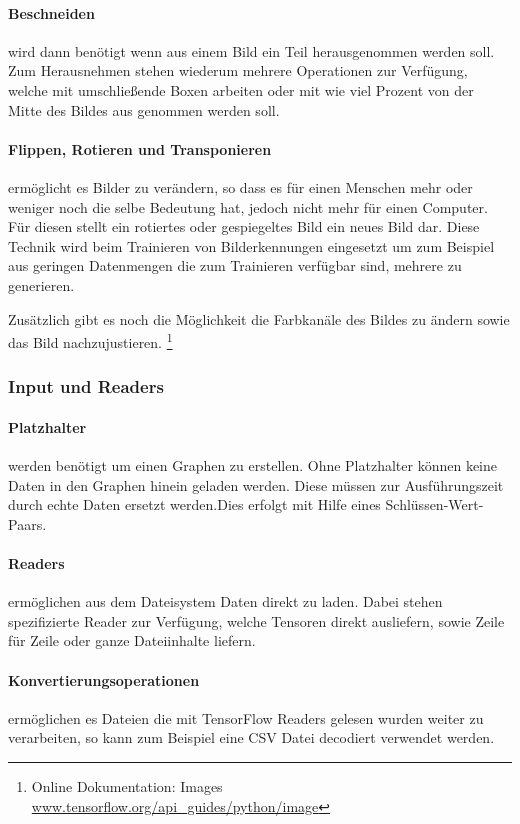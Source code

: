 \paragraph{Beschneiden} wird dann benötigt wenn aus einem Bild ein Teil herausgenommen werden soll. 
Zum Herausnehmen stehen wiederum mehrere Operationen zur Verfügung, welche mit umschließende Boxen arbeiten oder mit wie viel Prozent von der Mitte des Bildes aus genommen werden soll.

\paragraph{Flippen, Rotieren und Transponieren} ermöglicht es Bilder zu verändern, so dass es für einen Menschen mehr oder weniger noch die selbe Bedeutung hat, jedoch nicht mehr für einen Computer. 
Für diesen stellt ein rotiertes oder gespiegeltes Bild ein neues Bild dar. 
Diese Technik wird beim Trainieren von Bilderkennungen eingesetzt um zum Beispiel aus geringen Datenmengen die zum Trainieren verfügbar sind, mehrere zu generieren.
\phantom \newline

\noindent
Zusätzlich gibt es noch die Möglichkeit die Farbkanäle des Bildes zu ändern sowie das Bild nachzujustieren. 
\footnote{Online Dokumentation: Images \url{www.tensorflow.org/api_guides/python/image}}

\subsubsection{Input und Readers}

\paragraph{Platzhalter} werden benötigt um einen Graphen zu erstellen. 
Ohne Platzhalter können keine Daten in den Graphen hinein geladen werden. 
Diese müssen zur Ausführungszeit durch echte Daten ersetzt werden.Dies erfolgt mit Hilfe eines Schlüssen-Wert-Paars. 

\paragraph{Readers} ermöglichen aus dem Dateisystem Daten direkt zu laden. 
Dabei stehen spezifizierte Reader zur Verfügung, welche Tensoren direkt ausliefern, sowie Zeile für Zeile  oder ganze Dateiinhalte liefern. 

\paragraph{Konvertierungsoperationen} ermöglichen es Dateien die mit TensorFlow Readers gelesen wurden weiter zu verarbeiten, so kann zum Beispiel eine CSV Datei decodiert verwendet werden.
\phantom \newline

